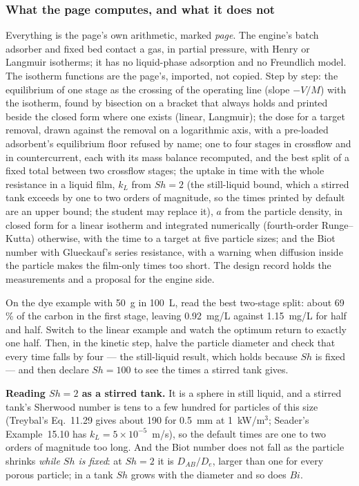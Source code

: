 \documentclass[11pt,a4paper]{article}
\begin{document}
\subsubsection*{What the page computes, and what it does not}

Everything is the page's own arithmetic, marked \emph{page}.  The engine's
batch adsorber and fixed bed contact a gas, in partial pressure, with Henry or
Langmuir isotherms; it has no liquid-phase adsorption and no Freundlich model.
The isotherm functions are the  page's, imported,
not copied.  Step by step: the equilibrium of one stage as the crossing of the
operating line (slope $-V/M$) with the isotherm, found by bisection on a
bracket that always holds and printed beside the closed form where one exists
(linear, Langmuir); the dose for a target removal, drawn against the removal on
a logarithmic axis, with a pre-loaded adsorbent's equilibrium floor refused by
name; one to four stages in crossflow and in countercurrent, each with its
mass balance recomputed, and the best split of a fixed total between two
crossflow stages; the uptake in time with the whole resistance in a liquid
film, $k_L$ from $\mathit{Sh} = 2$ (the still-liquid bound, which a stirred tank
exceeds by one to two orders of magnitude, so the times printed by default are an
upper bound; the student may replace it), $a$ from the particle density, in closed form for a linear isotherm
and integrated numerically (fourth-order Runge--Kutta) otherwise, with the time
to a target at five particle sizes; and the Biot number with Glueckauf's
series resistance, with a warning when diffusion inside the particle makes the
film-only times too short.  The design record
 holds the
measurements and a proposal for the engine side.

\begin{tryit}
On the dye example with 50~g in 100~L, read the best two-stage split: about
69\,\% of the carbon in the first stage, leaving 0.92~mg/L against 1.15~mg/L for
half and half.  Switch to the linear example and watch the optimum return to
exactly one half.  Then, in the kinetic step, halve the particle diameter and
check that every time falls by four --- the still-liquid result, which holds
because $\mathit{Sh}$ is fixed --- and then declare $\mathit{Sh}=100$ to see the
times a stirred tank gives.
\end{tryit}

\begin{pitfall}
\textbf{Reading $\mathit{Sh}=2$ as a stirred tank.}  It is a sphere in still
liquid, and a stirred tank's Sherwood number is tens to a few hundred for
particles of this size (Treybal's Eq.~11.29 gives about 190 for 0.5~mm at
1~kW/m$^3$; Seader's Example~15.10 has $k_L = 5\times10^{-5}$~m/s), so the
default times are one to two orders of magnitude too long.  And the Biot number
does not fall as the particle shrinks \emph{while $\mathit{Sh}$ is fixed}: at
$\mathit{Sh} = 2$ it is $D_{AB}/D_e$, larger than one for every porous particle;
in a tank $\mathit{Sh}$ grows with the diameter and so does $\mathit{Bi}$.
\end{pitfall}
\end{document}
